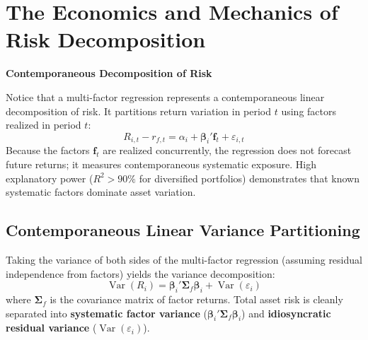 \section{The Economics and Mechanics of Risk Decomposition}
\label{sec:03-decomposition}

\begin{callout}
\noindent \textbf{Contemporaneous Decomposition of Risk}

Notice that a multi-factor regression represents a contemporaneous linear decomposition of risk. It partitions return variation in period $t$ using factors realized in period $t$:
\begin{equation}
  R_{i,t} - r_{f,t} = \alpha_i + \boldsymbol{\beta}_i' \mathbf{f}_t + \varepsilon_{i,t}
\end{equation}
Because the factors $\mathbf{f}_t$ are realized concurrently, the regression does not forecast future returns; it measures contemporaneous systematic exposure. High explanatory power ($R^2 > 90\%$ for diversified portfolios) demonstrates that known systematic factors dominate asset variation.
\end{callout}

\subsection{Contemporaneous Linear Variance Partitioning}
Taking the variance of both sides of the multi-factor regression (assuming residual independence from factors) yields the variance decomposition:
\begin{equation}
  \operatorname{Var}(R_i) = \boldsymbol{\beta}_i' \boldsymbol{\Sigma}_f \boldsymbol{\beta}_i + \operatorname{Var}(\varepsilon_i)
  \label{eq:03-vardec}
\end{equation}
where $\boldsymbol{\Sigma}_f$ is the covariance matrix of factor returns. Total asset risk is cleanly separated into \textbf{systematic factor variance} ($\boldsymbol{\beta}_i' \boldsymbol{\Sigma}_f \boldsymbol{\beta}_i$) and \textbf{idiosyncratic residual variance} ($\operatorname{Var}(\varepsilon_i)$).

